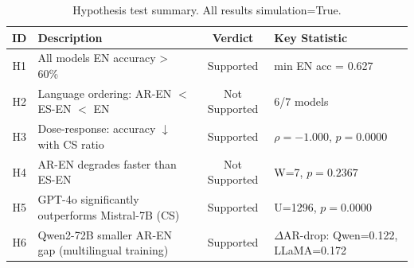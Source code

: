 \begin{table}[t]
\centering
\caption{Hypothesis test summary. All results simulation=True.}
\label{tab:hypotheses}
\begin{tabular}{clcl}
\toprule
ID & Description & Verdict & Key Statistic \\
\midrule
H1 & All models EN accuracy > 60\% & \textcolor{green!50!black}{Supported} & min EN acc = 0.627 \\
H2 & Language ordering: AR-EN $<$ ES-EN $<$ EN & \textcolor{red!60!black}{Not Supported} & 6/7 models \\
H3 & Dose-response: accuracy $\downarrow$ with CS ratio & \textcolor{green!50!black}{Supported} & $\rho=-1.000$, $p=0.0000$ \\
H4 & AR-EN degrades faster than ES-EN & \textcolor{red!60!black}{Not Supported} & W=7, $p=0.2367$ \\
H5 & GPT-4o significantly outperforms Mistral-7B (CS) & \textcolor{green!50!black}{Supported} & U=1296, $p=0.0000$ \\
H6 & Qwen2-72B smaller AR-EN gap (multilingual training) & \textcolor{green!50!black}{Supported} & $\Delta$AR-drop: Qwen=0.122, LLaMA=0.172 \\
\bottomrule
\end{tabular}
\end{table}